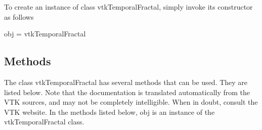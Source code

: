 To create an instance of class vtk\-Temporal\-Fractal, simply invoke its constructor as follows \begin{DoxyVerb}  obj = vtkTemporalFractal
\end{DoxyVerb}
 \hypertarget{vtkwidgets_vtkxyplotwidget_Methods}{}\subsection{Methods}\label{vtkwidgets_vtkxyplotwidget_Methods}
The class vtk\-Temporal\-Fractal has several methods that can be used. They are listed below. Note that the documentation is translated automatically from the V\-T\-K sources, and may not be completely intelligible. When in doubt, consult the V\-T\-K website. In the methods listed below, {\ttfamily obj} is an instance of the vtk\-Temporal\-Fractal class. 

